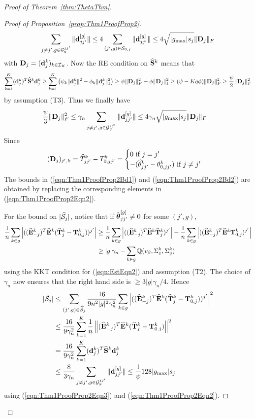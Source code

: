 \documentclass[12pt, letterpaper]{article}
\numberwithin{equation}{section}
\begin{document}
\begin{proof}[Proof of Theorem~\ref{thm:ThetaThm}]
\begin{proof}[Proof of Proposition~\ref{prop:Thm1ProofProp2}]
$$\sum_{j \neq j', g \in {\cal{G}}_y^{jj'}} \| {\bf{d}}_{jj'}^{[g]} \| \leq
4 \sum_{(j',g) \in {\cal{S}}_{0,j}} \| {\bf{d}}_{jj'}^{[g]} \| \leq 4 \sqrt{| g_{\max}| s_j} \| {\mathbf{D}}_j \|_F
$$
% 
with ${\mathbf{D}}_j = ({\bf{d}}_j^k)_{k \in {\cal{I}}_K}$. Now the RE condition on $\widehat {{\mathbf{S}}}^k$ means that
%
$$
\sum_{k=1}^K ({\bf{d}}_j^k)^T \widehat {{\mathbf{S}}}^k {\bf{d}}_j^k \geq 
\sum_{k=1}^K \left( \psi_k \| {\bf{d}}_j^k \|^2 - \phi_k \| {\bf{d}}_j^k \|_1^2 \right) \geq
\psi \| {\mathbf{D}}_j \|_F^2 - \phi \| {\mathbf{D}}_j \|_1^2 \geq 
(\psi - Kq \phi ) \| {\mathbf{D}}_j \|_F^2 \geq \frac{\psi}{2}  \| {\mathbf{D}}_j \|_F^2
$$
%
by assumption (T3). Thus we finally have
%
\begin{align}\label{eqn:Thm1ProofProp2Eqn2}
\frac{\psi}{3} \| {\mathbf{D}}_j \|_F^2 & \leq
\gamma_n \sum_{j \neq j', g \in {\cal{G}}_y^{jj'}} \| {\bf{d}}_{jj'}^{[g]} \| \leq
4 \gamma_n \sqrt{| g_{\max}| s_j} \| {\mathbf{D}}_j\|_F
\end{align}
%
Since
%
$$
({\mathbf{D}}_j)_{j',k} = \widehat T_{jj'}^k - T_{0,jj'}^k = \begin{cases}
0 \text{ if } j = j'\\
-(\widehat \theta_{jj'}^k - \theta_{0,jj'}^k ) \text{ if } j \neq j'
\end{cases}
$$
%
The bounds in (\ref{eqn:Thm1ProofProp2Bd1}) and (\ref{eqn:Thm1ProofProp2Bd2}) are obtained by replacing the corresponding elements in (\ref{eqn:Thm1ProofProp2Eqn2}).

For the bound on $| \widehat {{\cal{S}}}_j|$, notice that if $\hat {{\boldsymbol{\theta}}}_{jj'}^{[g]} \neq 0$ for some $(j',g)$,
%
\begin{align*}
\frac{1}{n} \sum_{k \in g} \left| ((\widehat {{\mathbf{E}}}_{-j}^k)^T \widehat {{\mathbf{E}}}^k ( \widehat {{\mathbf{T}}}_j^k - {\mathbf{T}}_{0,j}^k ))^{j'} \right| & \geq
\frac{1}{n} \sum_{k \in g} \left| ((\widehat {{\mathbf{E}}}_{-j}^k)^T \widehat {{\mathbf{E}}}^k \widehat {{\mathbf{T}}}_j^k )^{j'} \right| - \frac{1}{n} \sum_{k \in g} \left| ((\widehat {{\mathbf{E}}}_{-j}^k)^T \widehat {{\mathbf{E}}}^k {\mathbf{T}}_{0,j}^k )^{j'} \right|\\
& \geq |g| \gamma_n - \sum_{k \in g} {\mathbb{Q}} ( v_\beta, \Sigma_x^k, \Sigma_y^k )
\end{align*}
%
using the KKT condition for (\ref{eqn:EstEqn2}) and assumption (T2). The choice of $\gamma_n$ now ensures that the right hand side is $\geq 3|g| \gamma_n / 4$. Hence
%
\begin{align*}
| \hat {{\cal{S}}}_j| & \leq \sum_{(j',g) \in \widehat {{\cal{S}}}_j} \frac{16}{9 n^2 |g|^2 \gamma_n^2 } \sum_{k \in g} \left| ((\widehat {{\mathbf{E}}}_{-j}^k)^T \widehat {{\mathbf{E}}}^k ( \widehat {{\mathbf{T}}}_j^k - {\mathbf{T}}_{0,j}^k ))^{j'} \right|^2\\
& \leq \frac{16}{9 \gamma_n^2} \sum_{k=1}^K \frac{1}{n} \left\| (\widehat {{\mathbf{E}}}_{-j}^k)^T \widehat {{\mathbf{E}}}^k ( \widehat {{\mathbf{T}}}_j^k - {\mathbf{T}}_{0,j}^k ) \right\|^2 \\
& = \frac{16}{9 \gamma_n^2} \sum_{k=1}^K ({\bf{d}}_j^k)^T \widehat {{\mathbf{S}}}^k {\bf{d}}_j^k \\
& \leq \frac{8}{3 \gamma_n} \sum_{j \neq j', g \in {\cal{G}}_y^{jj'}} \| {\bf{d}}_{jj'}^{[g]} \| \leq \frac{1}{\psi} 128 | g_{\max}| s_j 
\end{align*}
%
using (\ref{eqn:Thm1ProofProp2Eqn3}) and (\ref{eqn:Thm1ProofProp2Eqn2}).


\end{proof}
\end{proof}
\end{document}
